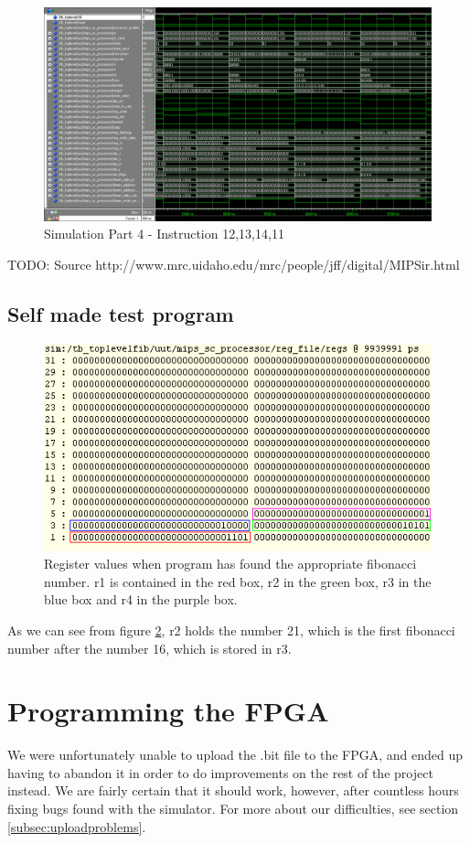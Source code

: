 \begin{figure}[ht]
    \centering
    \includegraphics[scale=0.3]{figures/sim4.png}
    \caption{\label{fig:sim4}Simulation Part 4 - Instruction 12,13,14,11}
\end{figure}

TODO: Source
http://www.mrc.uidaho.edu/mrc/people/jff/digital/MIPSir.html
\clearpage

\subsection{Self made test program}
\begin{figure}[ht]
    \centering
    \includegraphics[scale=1.0]{figures/fibtest.png}
    \caption{\label{fig:fibsim}Register values when program has found the appropriate fibonacci number. r1 is contained in the {\color{red} red box}, r2 in the {\color{green} green box}, r3 in the {\color{blue} blue box} and r4 in the {\color{magenta} purple box}.}
\end{figure}

As we can see from figure \ref{fig:fibsim}, r2 holds the number 21, which is the first fibonacci number after the number 16, which is stored in r3.

\section{Programming the FPGA}
We were unfortunately unable to upload the .bit file to the FPGA, and ended up having to abandon it in order to do improvements on the rest of the project instead.
We are fairly certain that it should work, however, after countless hours fixing bugs found with the simulator.
For more about our difficulties, see section \ref{subsec:uploadproblems}.
